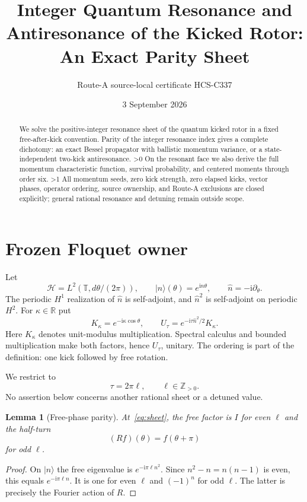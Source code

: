 \documentclass[10pt]{article}
\title{Integer Quantum Resonance and Antiresonance of the Kicked Rotor:\\
An Exact Parity Sheet}
\author{Route-A source-local certificate HCS-C337}
\date{3 September 2026}
\providecommand{\CRevisionRound}{2}
\newtheorem{lemma}[theorem]{Lemma}
\newcommand{\HH}{\mathcal H}
\newcommand{\ZZ}{\mathbb Z}
\newcommand{\opn}{\widehat n}
\newcommand{\ii}{\mathrm i}
\begin{document}
\maketitle
\begin{abstract}
We solve the positive-integer resonance sheet of the quantum kicked rotor in
a fixed free-after-kick convention.  Parity of the integer resonance index
gives a complete dichotomy: an exact Bessel propagator with ballistic
momentum variance, or a state-independent two-kick antiresonance.
\ifnum\CRevisionRound>0
On the resonant face we also derive the full momentum characteristic
function, survival probability, and centered moments through order six.
\fi
\ifnum\CRevisionRound>1
All momentum seeds, zero kick strength, zero elapsed kicks, vector phases,
operator ordering, source ownership, and Route-A exclusions are closed
explicitly; general rational resonance and detuning remain outside scope.
\fi
\end{abstract}

\section{Frozen Floquet owner}
Let
\[
 \HH=L^2(\mathbb T,d\theta/(2\pi)),\qquad
 |n\rangle(\theta)=e^{\ii n\theta},\qquad
 \opn=-\ii\partial_\theta.
\]
The periodic $H^1$ realization of $\opn$ is self-adjoint, and $\opn^2$
is self-adjoint on periodic $H^2$.  For $\kappa\in\mathbb R$ put
\[
 K_\kappa=e^{-\ii\kappa\cos\theta},\qquad
 U_\tau=e^{-\ii\tau\opn^2/2}K_\kappa.
\]
Here $K_\kappa$ denotes unit-modulus multiplication.  Spectral calculus and
bounded multiplication make both factors, hence $U_\tau$, unitary.  The
ordering is part of the definition: one kick followed by free rotation.

We restrict to
\begin{equation}\label{eq:sheet}
 \tau=2\pi\ell,\qquad \ell\in\ZZ_{>0}.
\end{equation}
No assertion below concerns another rational sheet or a detuned value.

\begin{lemma}[Free-phase parity]\label{lem:parity}
At~\eqref{eq:sheet}, the free factor is $I$ for even $\ell$ and the half-turn
\[
 (Rf)(\theta)=f(\theta+\pi)
\]
for odd $\ell$.
\end{lemma}

\begin{proof}
On $|n\rangle$ the free eigenvalue is $e^{-\ii\pi\ell n^2}$.  Since
$n^2-n=n(n-1)$ is even, this equals $e^{-\ii\pi\ell n}$.  It is one for
even $\ell$ and $(-1)^n$ for odd $\ell$.  The latter is precisely the
Fourier action of $R$.
\end{proof}
\end{document}
